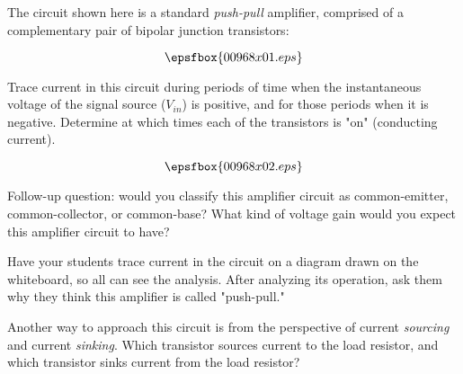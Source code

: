 

The circuit shown here is a standard {\it push-pull} amplifier, comprised of a complementary pair of bipolar junction transistors:

$$\epsfbox{00968x01.eps}$$

Trace current in this circuit during periods of time when the instantaneous voltage of the signal source ($V_{in}$) is positive, and for those periods when it is negative.  Determine at which times each of the transistors is "on" (conducting current).







$$\epsfbox{00968x02.eps}$$

\vskip 10pt

Follow-up question: would you classify this amplifier circuit as common-emitter, common-collector, or common-base?  What kind of voltage gain would you expect this amplifier circuit to have?







Have your students trace current in the circuit on a diagram drawn on the whiteboard, so all can see the analysis.  After analyzing its operation, ask them why they think this amplifier is called "push-pull."  

Another way to approach this circuit is from the perspective of current {\it sourcing} and current {\it sinking}.  Which transistor sources current to the load resistor, and which transistor sinks current from the load resistor?




